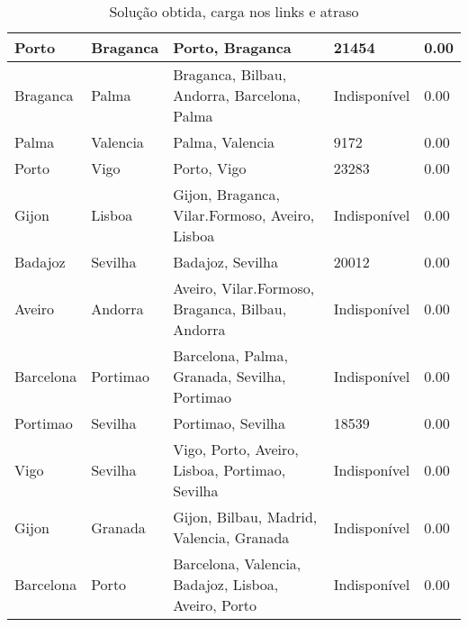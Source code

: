 \begin{table}[!htb]
{\begin{tabular}{|l|l|l|l|l|}
Porto & Braganca & Porto, Braganca & 21454 & 0.00 \\ \hline
Braganca & Palma & Braganca, Bilbau, Andorra, Barcelona, Palma & Indisponível & 0.00 \\ \hline
Palma & Valencia & Palma, Valencia & 9172 & 0.00 \\ \hline
Porto & Vigo & Porto, Vigo & 23283 & 0.00 \\ \hline
Gijon & Lisboa & Gijon, Braganca, Vilar.Formoso, Aveiro, Lisboa & Indisponível & 0.00 \\ \hline
Badajoz & Sevilha & Badajoz, Sevilha & 20012 & 0.00 \\ \hline
Aveiro & Andorra & Aveiro, Vilar.Formoso, Braganca, Bilbau, Andorra & Indisponível & 0.00 \\ \hline
Barcelona & Portimao & Barcelona, Palma, Granada, Sevilha, Portimao & Indisponível & 0.00 \\ \hline
Portimao & Sevilha & Portimao, Sevilha & 18539 & 0.00 \\ \hline
Vigo & Sevilha & Vigo, Porto, Aveiro, Lisboa, Portimao, Sevilha & Indisponível & 0.00 \\ \hline
Gijon & Granada & Gijon, Bilbau, Madrid, Valencia, Granada & Indisponível & 0.00 \\ \hline
Barcelona & Porto & Barcelona, Valencia, Badajoz, Lisboa, Aveiro, Porto & Indisponível & 0.00 \\ \hline
\end{tabular}}
\caption[]{Solução obtida, carga nos links e atraso}
\end{table}

